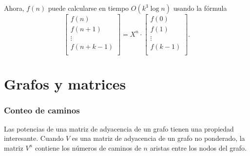 \begin{samepage}
Ahora, $f(n)$ puede calcularse en
tiempo $O(k^3 \log n)$ usando la fórmula
\[
 \begin{bmatrix}
  f(n) \\
  f(n+1) \\
  \vdots \\
  f(n+k-1) \\
 \end{bmatrix}
=
X^n \cdot
 \begin{bmatrix}
  f(0) \\
  f(1) \\
  \vdots \\
  f(k-1) \\
 \end{bmatrix}.
\]
\end{samepage}

\section{Grafos y matrices}

\subsubsection{Conteo de caminos}

Las potencias de una matriz de adyacencia de un grafo
tienen una propiedad interesante.
Cuando $V$ es una matriz de adyacencia de un grafo no ponderado,
la matriz $V^n$ contiene los números de caminos de
$n$ aristas entre los nodos del grafo.

